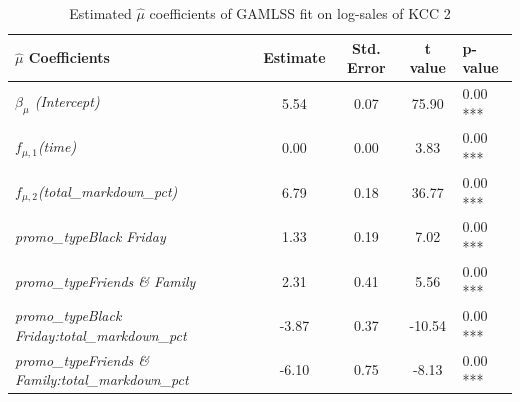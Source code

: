 \begin{table}[H]
\centering
\begin{tabular}{l|c|c|c|l}
  \hline
  \rowcolor{white}
 \textbf{$\hat{\mu}$ Coefficients} & \textbf{Estimate} & \textbf{Std. Error} & \textbf{t value} & \textbf{p-value} \\ 
  \hline\hline
\textit{$\beta_{\mu}$ (Intercept)} & 5.54 & 0.07 & 75.90 & 0.00 *** \\ 
  \textit{$f_{\mu, 1}$(time)} & 0.00 & 0.00 & 3.83 & 0.00 *** \\ 
  \textit{$f_{\mu ,2}$(total\_markdown\_pct)} & 6.79 & 0.18 & 36.77 & 0.00 *** \\ 
  \textit{promo\_typeBlack Friday} & 1.33 & 0.19 & 7.02 & 0.00 *** \\ 
  \textit{promo\_typeFriends \& Family} & 2.31 & 0.41 & 5.56 & 0.00 *** \\ 
  \textit{promo\_typeBlack Friday:total\_markdown\_pct} & -3.87 & 0.37 & -10.54 & 0.00 *** \\ 
  \textit{promo\_typeFriends \& Family:total\_markdown\_pct} & -6.10 & 0.75 & -8.13 & 0.00 *** \\ \hline
\end{tabular}
\caption{Estimated $\hat{\mu}$ coefficients of \ac{GAMLSS} fit on log-sales of \ac{KCC} 2}
\label{tab:gamlss_coeff_kcc_2}
\end{table}











